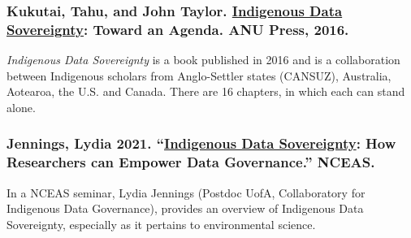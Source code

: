 \documentclass[
]{book}
\begin{document}
\hypertarget{kukutai-tahu-and-john-taylor.-indigenous-data-sovereignty-toward-an-agenda.-anu-press-2016.}{%
\subsubsection*{\texorpdfstring{Kukutai, Tahu, and John Taylor. \href{https://static1.squarespace.com/static/5d2633cb0ef5e4000134fa02/t/5d7a7610da91c0143184a9d1/1568306712324/Indigenous\%2BData\%2BSovereignty\%2BBook.pdf}{Indigenous Data Sovereignty}: Toward an Agenda. ANU Press, 2016.}{Kukutai, Tahu, and John Taylor. Indigenous Data Sovereignty: Toward an Agenda. ANU Press, 2016.}}\label{kukutai-tahu-and-john-taylor.-indigenous-data-sovereignty-toward-an-agenda.-anu-press-2016.}}

\emph{Indigenous Data Sovereignty} is a book published in 2016 and is a collaboration between Indigenous scholars from Anglo-Settler states (CANSUZ), Australia, Aotearoa, the U.S. and Canada. There are 16 chapters, in which each can stand alone.

\hypertarget{jennings-lydia-2021.-indigenous-data-sovereignty-how-researchers-can-empower-data-governance.-nceas.}{%
\subsubsection*{\texorpdfstring{Jennings, Lydia 2021. ``\href{https://www.youtube.com/watch?v=RjolET69Z8c}{Indigenous Data Sovereignty}: How Researchers can Empower Data Governance.'' NCEAS.}{Jennings, Lydia 2021. ``Indigenous Data Sovereignty: How Researchers can Empower Data Governance.'' NCEAS.}}\label{jennings-lydia-2021.-indigenous-data-sovereignty-how-researchers-can-empower-data-governance.-nceas.}}

In a NCEAS seminar, Lydia Jennings (Postdoc UofA, Collaboratory for Indigenous Data Governance), provides an overview of Indigenous Data Sovereignty, especially as it pertains to environmental science.
\end{document}
